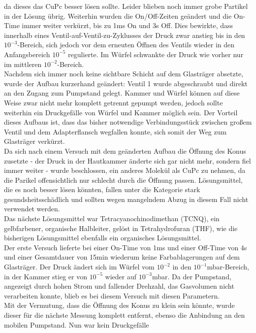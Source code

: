 da dieses das CuPc besser lösen sollte. Leider blieben noch immer grobe Partikel in der Lösung übrig. Weiterhin
wurden die On/Off-Zeiten geändert und die On-Time immer weiter verkürzt, bis zu 1ms On und 3s Off. Dies
bewirkte, dass innerhalb eines Ventil-auf-Ventil-zu-Zyklusses der Druck zwar anstieg bis in den
$10^{-3}$-Bereich, sich jedoch vor dem erneuten Öffnen des Ventils wieder in den Anfangsbereich $10^{-5}$
regulierte. Im Würfel schwankte der Druck wie vorher nur im mittleren $10^{-2}$-Bereich.\\
Nachdem sich immer noch keine sichtbare Schicht auf dem Glasträger absetzte, wurde der Aufbau kurzerhand
geändert: Ventil 1 wurde abgeschraubt und direkt
an den Zugang zum Pumpstand gelegt.
Kammer und Würfel können auf diese Weise zwar nicht mehr komplett getrennt gepumpt werden, jedoch sollte
weiterhin ein Druckgefälle von Würfel und Kammer möglich sein. Der Vorteil dieses Aufbaus ist, dass das bisher
notwendige Verbindungsstück zwischen großem Ventil und dem Adapterflansch wegfallen konnte, sich somit der Weg
zum Glasträger verkürzt. \\
 Da sich nach einem Versuch mit dem geänderten Aufbau die Öffnung des Konus zusetzte - der Druck in der
 Hautkammer änderte sich gar nicht mehr, sondern fiel immer weiter - wurde beschlossen, ein anderes Molekül als CuPc zu nehmen, da die
Parikel offensichtlich nur schlecht durch die Öffnung passen. Lösungsmittel, die es noch besser lösen könnten,
fallen unter die Kategorie stark gesundsheitsschädlich und sollten wegen mangelndem Abzug in diesem Fall nicht
verwendet werden.\\
Das nächste Lösungsmittel war Tetracyanochinodimethan (TCNQ), ein gelbfarbener, organische
Halbleiter, gelöst in Tetrahydrofuran (THF), wie die bisherigen Lösungsmittel ebenfalls ein
organisches Lösungsmittel. \\
Der erste Versuch lieferte bei einer On-Time von 1ms und einer Off-Time von 4s und einer
Gesamtdauer von 15min wiederum keine Farbablagerungen auf dem Glasträger. Der Druck ändert sich im
Würfel vom $10^{-2}$ in den $10^{-1}$mbar-Bereich, in der Kammer stieg er von $10^{-5}$ wieder auf $10^{-3}$mbar. Da der
Pumpstand, angezeigt durch hohen Strom und fallender Drehzahl, das Gasvolumen nicht verarbeiten
konnte, blieb es bei diesem Versuch mit diesen Parametern.\\
Mit der Vermutung, dass die Öffnung des Konus zu klein sein könnte, wurde dieser für die nächste
Messung komplett entfernt, ebenso die Anbindung an den mobilen Pumpstand. Nun war kein Druckgefälle
